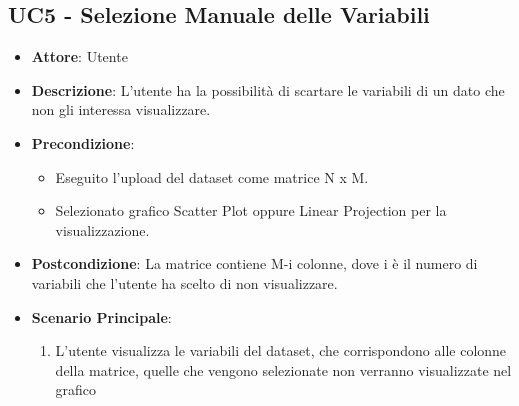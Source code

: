     \subsection{UC5 - Selezione Manuale delle Variabili}
    \begin{itemize}
    \item \textbf{Attore}: Utente
    \item \textbf{Descrizione}: L'utente ha la possibilità di scartare le variabili di un dato che non gli interessa visualizzare.
    \item \textbf{Precondizione}: 
     \begin{itemize}
        \item Eseguito l'upload del dataset come matrice N x M.
        \item Selezionato grafico Scatter Plot oppure Linear Projection per la visualizzazione.
    \end{itemize}
    \item \textbf{Postcondizione}: La matrice contiene M-i colonne, dove i è il numero di variabili che l'utente ha scelto di non visualizzare.
    \item \textbf{Scenario Principale}: 
    \begin{enumerate}
        \item L'utente visualizza le variabili del dataset, che corrispondono alle colonne della matrice, quelle che vengono selezionate non verranno visualizzate nel grafico
    \end{enumerate}  
    \end{itemize}
    

